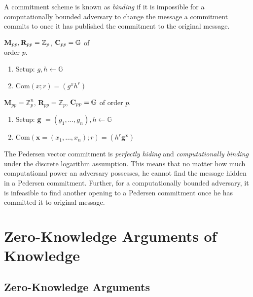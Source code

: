 A commitment scheme is known as \textit{binding} if it is impossible for a computationally bounded adversary to change the message a commitment commits to once it has published the commitment to the original message.

\begin{defn}
    ${\normalfont \textbf{M}}_{pp}, {\normalfont \textbf{R}}_{pp} = \mathbb{Z}_p$, ${\normalfont \textbf{C}}_{pp} = \mathbb{G}$ of \\order $p$.
    \begin{enumerate}
        \item {\normalfont Setup}: $g, h \leftarrow \mathbb{G}$
        \item {\normalfont Com}$(x; r) = (g^x h^r)$
    \end{enumerate}
\end{defn}

\begin{defn}
    {\normalfont \textbf{M}}$_{pp} = \mathbb{Z}_p^n$, {\normalfont \textbf{R}}$_{pp} = \mathbb{Z}_p$, ${\normalfont \textbf{C}}_{pp} = \mathbb{G}$ of order $p$.
    \begin{enumerate}
        \item {\normalfont Setup}: \textbf{g} $= (g_1, \dots, g_n), h \leftarrow \mathbb{G}$
        \item {\normalfont Com}$(\textbf{x} = (x_1, \dots, x_n); r) = (h^r \textbf{g}^{\textbf{x}})$
    \end{enumerate}
\end{defn}

The Pedersen vector commitment is \textit{perfectly hiding} and \textit{computationally binding} under the
discrete logarithm assumption. This means that no matter how much computational power an adversary possesses, he cannot find the message hidden in a Pedersen commitment.
Further, for a computationally bounded adversary, it is infeasible to find another opening to a Pedersen commitment once he has committed it to original message.

\section{Zero-Knowledge Arguments of Knowledge}

\subsection{Zero-Knowledge Arguments}

